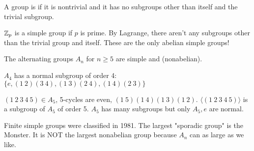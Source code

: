 \documentclass[class=article,crop=false]{standalone}
\begin{document}
\begin{defn}
A group is  if it is nontrivial and it has no  subgroups other than itself and the trivial subgroup. 
\end{defn}

\begin{claim}[]
$ \mathbb{Z}_p$ is a simple group if $ p$ is prime. By Lagrange, there aren't any subgroups other than the trivial group and itself. These are the only abelian simple groups!

\end{claim}
\begin{thm}[15.15]
	The alternating groups $ A_n$ for $ n \geq 5$ are simple and (nonabelian).
\end{thm}
\begin{note}[]
	$ A_4$ has a normal subgroup of order 4: $ \{e, (1\ 2)(3\ 4),(1\ 3)(2\ 4),(1\ 4)(2\ 3)\} $
\end{note}
\begin{note}[]
	$ (1\ 2\ 3\ 4\ 5) \in A_5$, 5-cycles are even, $ (1\ 5)(1\ 4)(1\ 3)(1\ 2)$.  $ \langle (1\ 2\ 3\ 4\ 5) \rangle$ is a subgroup of $ A_5$ of order 5. $ A_5$ has many subgroups but only $ A_5, e$ are normal.
\end{note}

\begin{remark}
Finite simple groups were classified in 1981. The largest "sporadic group" is the Monster. It is NOT the largest nonabelian group because $ A_n$ can as large as we like. 
\end{remark}
\end{document}
